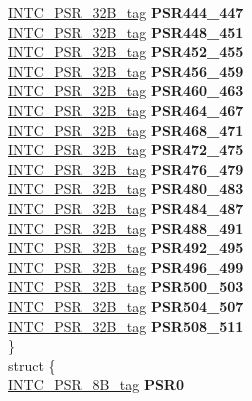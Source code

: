 \begin{DoxyCompactItemize}
\begin{tabbing}
\>\>\mbox{\hyperlink{unionINTC__PSR__32B__tag}{INTC\_PSR\_32B\_tag}} {\bfseries PSR444\_447}\\
\>\>\mbox{\hyperlink{unionINTC__PSR__32B__tag}{INTC\_PSR\_32B\_tag}} {\bfseries PSR448\_451}\\
\>\>\mbox{\hyperlink{unionINTC__PSR__32B__tag}{INTC\_PSR\_32B\_tag}} {\bfseries PSR452\_455}\\
\>\>\mbox{\hyperlink{unionINTC__PSR__32B__tag}{INTC\_PSR\_32B\_tag}} {\bfseries PSR456\_459}\\
\>\>\mbox{\hyperlink{unionINTC__PSR__32B__tag}{INTC\_PSR\_32B\_tag}} {\bfseries PSR460\_463}\\
\>\>\mbox{\hyperlink{unionINTC__PSR__32B__tag}{INTC\_PSR\_32B\_tag}} {\bfseries PSR464\_467}\\
\>\>\mbox{\hyperlink{unionINTC__PSR__32B__tag}{INTC\_PSR\_32B\_tag}} {\bfseries PSR468\_471}\\
\>\>\mbox{\hyperlink{unionINTC__PSR__32B__tag}{INTC\_PSR\_32B\_tag}} {\bfseries PSR472\_475}\\
\>\>\mbox{\hyperlink{unionINTC__PSR__32B__tag}{INTC\_PSR\_32B\_tag}} {\bfseries PSR476\_479}\\
\>\>\mbox{\hyperlink{unionINTC__PSR__32B__tag}{INTC\_PSR\_32B\_tag}} {\bfseries PSR480\_483}\\
\>\>\mbox{\hyperlink{unionINTC__PSR__32B__tag}{INTC\_PSR\_32B\_tag}} {\bfseries PSR484\_487}\\
\>\>\mbox{\hyperlink{unionINTC__PSR__32B__tag}{INTC\_PSR\_32B\_tag}} {\bfseries PSR488\_491}\\
\>\>\mbox{\hyperlink{unionINTC__PSR__32B__tag}{INTC\_PSR\_32B\_tag}} {\bfseries PSR492\_495}\\
\>\>\mbox{\hyperlink{unionINTC__PSR__32B__tag}{INTC\_PSR\_32B\_tag}} {\bfseries PSR496\_499}\\
\>\>\mbox{\hyperlink{unionINTC__PSR__32B__tag}{INTC\_PSR\_32B\_tag}} {\bfseries PSR500\_503}\\
\>\>\mbox{\hyperlink{unionINTC__PSR__32B__tag}{INTC\_PSR\_32B\_tag}} {\bfseries PSR504\_507}\\
\>\>\mbox{\hyperlink{unionINTC__PSR__32B__tag}{INTC\_PSR\_32B\_tag}} {\bfseries PSR508\_511}\\
\>\} \\
\mbox{\label{unionINTC__struct__tag_1_1_0D2291_ae72eca53e325753fea79f44366eca211}} 
\>struct \{\\
\>\>\mbox{\hyperlink{unionINTC__PSR__8B__tag}{INTC\_PSR\_8B\_tag}} {\bfseries PSR0}\\

\end{tabbing}
\end{DoxyCompactItemize}
